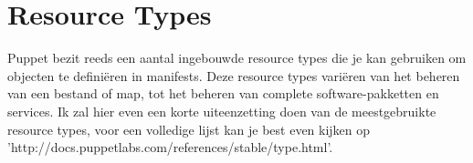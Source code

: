 \chapter{Resource Types}
Puppet bezit reeds een aantal ingebouwde resource types die je kan gebruiken om objecten te defini\"{e}ren in manifests. Deze resource types vari\"{e}ren van het beheren van een bestand of map, tot het beheren van complete software-pakketten en services. Ik zal hier even een korte uiteenzetting doen van de meestgebruikte resource types, voor een volledige lijst kan je best even kijken op 'http://docs.puppetlabs.com/references/stable/type.html'.














%
%
%
%
%
%
%
%
%
